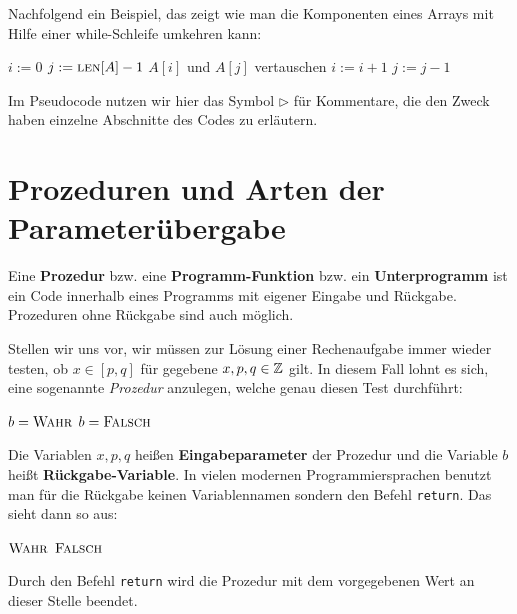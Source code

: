 \begin{bsp} 
Nachfolgend ein Beispiel, das zeigt wie man die Komponenten eines Arrays mit Hilfe einer while-Schleife umkehren kann:
\begin{center}
	\begin{algorithmic}[1]
		\STATE $i:=0$
		\STATE $j:=\mathop{\text{\textsc{len}}}[A]-1$
		\STATE $A[i]$ und $A[j]$ vertauschen 
		\STATE $i:=i+1$ 
		\STATE $j:=j-1$ 
		\ENDWHILE
	\end{algorithmic}
\end{center}
\end{bsp} 

\begin{bem} 
Im Pseudocode nutzen wir hier das Symbol $\triangleright$ für Kommentare, die den Zweck haben einzelne Abschnitte des Codes zu erläutern.
\end{bem} 


\section{Prozeduren und Arten der Parameterübergabe}
\label{sect:prozeduren}

\begin{defn}
Eine \textbf{Prozedur} bzw. eine \textbf{Programm-Funktion} bzw. ein \textbf{Unterprogramm} ist ein Code innerhalb eines Programms mit eigener Eingabe und Rückgabe. Prozeduren ohne Rückgabe sind auch möglich. 
\end{defn} 

\begin{bem} 
Stellen wir uns vor, wir müssen zur Lösung einer Rechenaufgabe immer wieder testen, ob $ x \in [p,q]$ für gegebene $x,p,q \in \mathbb{Z}$ gilt. In diesem Fall lohnt es sich, eine sogenannte \emph{Prozedur} anzulegen, welche genau diesen Test durchführt:

\begin{algorithm}[H]
	\caption{$b=\cc{Ist-zwischen}(x,p,q)$}
	\begin{algorithmic}
		\STATE $b=\mathop{\text{\textsc{Wahr}}}$
		\ENDIF
		\STATE $b=\mathop{\text{\textsc{Falsch}}}$
	\end{algorithmic}
\end{algorithm}

Die Variablen $x,p,q$ heißen \textbf{Eingabeparameter} der Prozedur und die Variable $b$ heißt \textbf{Rückgabe-Variable}. In vielen modernen Programmiersprachen benutzt man für die Rückgabe keinen Variablennamen sondern den Befehl \texttt{return}. Das sieht dann so aus: 

\begin{algorithm}[H]
	\caption{$\cc{Ist-zwischen}(x,p,q)$}
	\begin{algorithmic}
		\IF{$p \le x \le q$ oder $q \le x \le p$}
		\RETURN $\mathop{\text{\textsc{Wahr}}}$
		\ENDIF
		\RETURN $\mathop{\text{\textsc{Falsch}}}$
	\end{algorithmic}
\end{algorithm}
Durch den Befehl \texttt{return} wird die Prozedur mit dem vorgegebenen Wert an dieser Stelle beendet.
\end{bem} 


